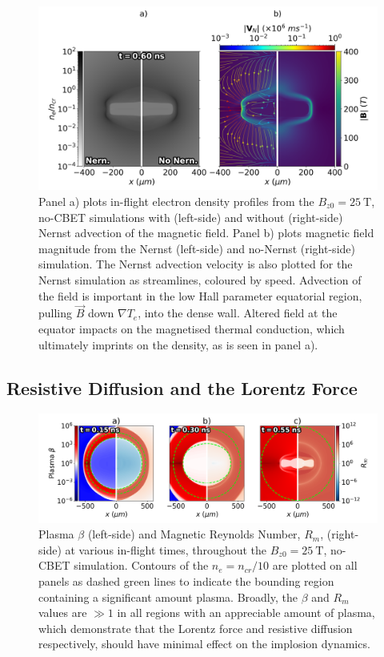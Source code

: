 \begin{figure}[t!]
    \includegraphics[width=0.8\linewidth]{Results2/Images/nernst_comp.png}
    \centering
    \caption{Panel a) plots in-flight electron density profiles from the $B_{z0}=25\ \text{T}$, no-\ac{CBET} simulations with (left-side) and without (right-side) Nernst advection of the magnetic field.
    Panel b) plots magnetic field magnitude from the Nernst (left-side) and no-Nernst (right-side) simulation.
    The Nernst advection velocity is also plotted for the Nernst simulation as streamlines, coloured by speed.
    Advection of the field is important in the low Hall parameter equatorial region, pulling $\vec{B}$ down $\nabla T_e$, into the dense wall.
    Altered field at the equator impacts on the magnetised thermal conduction, which ultimately imprints on the density, as is seen in panel a).}%
    \label{fig:Res2_nernst_comp}
\end{figure}



\subsection{Resistive Diffusion and the Lorentz Force}%
\label{sec:Res2_resis}

\begin{figure}[t!]
    \includegraphics[width=\linewidth]{Results2/Images/magmag_beta_Rm.png}
    \centering
    \caption{Plasma $\beta$ (left-side) and Magnetic Reynolds Number, $R_m$, (right-side) at various in-flight times, throughout the $B_{z0}=25\ \text{T}$, no-\ac{CBET} simulation.
    Contours of the $n_e=n_{cr}/10$ are plotted on all panels as dashed green lines to indicate the bounding region containing a significant amount plasma.
    Broadly, the $\beta$ and $R_m$ values are $\gg 1$ in all regions with an appreciable amount of plasma, which demonstrate that the Lorentz force and resistive diffusion respectively, should have minimal effect on the implosion dynamics.}%
    \label{fig:Res2_magmag_beta_Rm}
\end{figure}



